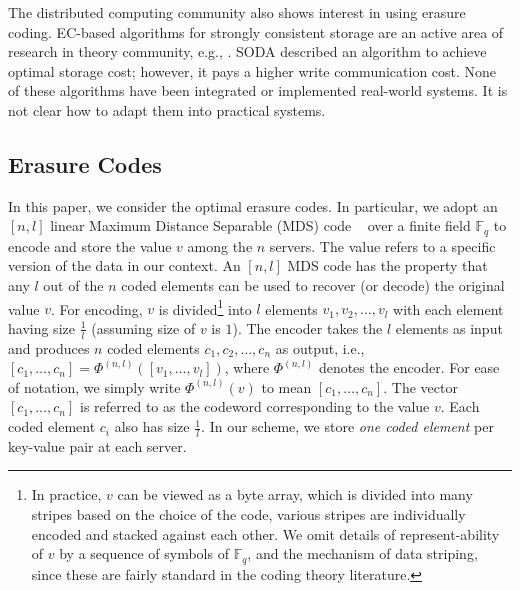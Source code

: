 The distributed computing community also shows interest in using erasure coding.
EC-based algorithms for strongly consistent storage are an active area of research in theory community, e.g., \cite{CadambeLMM17, SODA2016, LDS2017, NicolaouC0KML19}.  SODA\cite{SODA2016} described an algorithm to achieve optimal storage cost; however, it pays a 
higher write communication cost. 
None of these algorithms have been integrated or implemented real-world systems. It is not clear how to adapt them into practical systems.



\subsection{Erasure Codes}
In this paper, we consider the optimal erasure codes. In particular, we adopt an $[n, l]$  linear Maximum Distance Separable (MDS) code ~\cite{verapless_book} over a finite field $\mathbb{F}_q$ to encode and store the value $v$ among the $n$ servers. The value refers to a specific version of the data in our context. An $[n, l]$ MDS code has the property that any $l$ out of the $n$ coded elements can be used to recover (or decode) the original value $v$. 
For encoding, $v$ is divided\footnote{In practice, $v$ can be viewed as a byte array, which is divided into many stripes based on the choice of the code, various stripes are individually encoded and stacked against each other. We omit details of represent-ability of $v$ by a sequence of symbols of $\mathbb{F}_q$, and the mechanism of data striping, since these are fairly standard in the coding theory literature.} into $l$ elements $v_1, v_2, \ldots, v_l$ with each element having  size $\frac{1}{l}$ (assuming size of $v$ is $1$). The encoder takes the $l$ elements as input and produces $n$ coded elements $c_1, c_2, \ldots, c_n$ as output, i.e., $[c_1, \ldots, c_n] = \Phi^{(n,l)}([v_1, \ldots, v_l])$, where $\Phi^{(n, l)}$ denotes the encoder. For ease of notation, we simply write $\Phi^{(n, l)}(v)$ to mean  $[c_1, \ldots, c_n]$. The vector $[c_1, \ldots, c_n]$ is  referred to as the codeword corresponding to the value $v$. Each coded element $c_i$ also has  size $\frac{1}{l}$. In our scheme, we store \textit{one coded element} per key-value pair at each server. 


